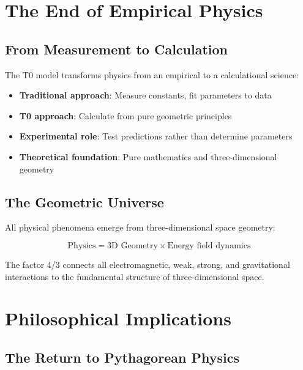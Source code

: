 \documentclass[12pt,a4paper]{report}
\begin{document}
\section{The End of Empirical Physics}
\label{sec:end_empirical_physics}

\subsection{From Measurement to Calculation}
\label{subsec:measurement_to_calculation}

The T0 model transforms physics from an empirical to a calculational science:

\begin{itemize}
	\item \textbf{Traditional approach}: Measure constants, fit parameters to data
	\item \textbf{T0 approach}: Calculate from pure geometric principles
	\item \textbf{Experimental role}: Test predictions rather than determine parameters
	\item \textbf{Theoretical foundation}: Pure mathematics and three-dimensional geometry
\end{itemize}

\subsection{The Geometric Universe}
\label{subsec:geometric_universe}

All physical phenomena emerge from three-dimensional space geometry:

\begin{equation}
	\text{Physics} = \text{3D Geometry} \times \text{Energy field dynamics}
\end{equation}

The factor 4/3 connects all electromagnetic, weak, strong, and gravitational interactions to the fundamental structure of three-dimensional space.

\section{Philosophical Implications}
\label{sec:philosophical_implications}

\subsection{The Return to Pythagorean Physics}
\label{subsec:pythagorean_physics}
\end{document}
